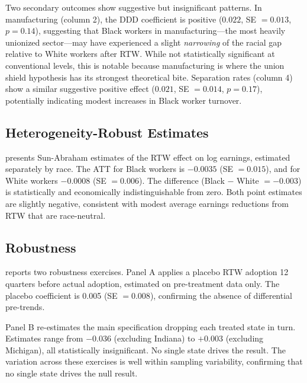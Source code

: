 \documentclass[12pt]{article}
\begin{document}
Two secondary outcomes show suggestive but insignificant patterns. In manufacturing (column 2), the DDD coefficient is positive ($0.022$, SE $= 0.013$, $p = 0.14$), suggesting that Black workers in manufacturing---the most heavily unionized sector---may have experienced a slight \textit{narrowing} of the racial gap relative to White workers after RTW. While not statistically significant at conventional levels, this is notable because manufacturing is where the union shield hypothesis has its strongest theoretical bite. Separation rates (column 4) show a similar suggestive positive effect ($0.021$, SE $= 0.014$, $p = 0.17$), potentially indicating modest increases in Black worker turnover.



\subsection{Heterogeneity-Robust Estimates}

 presents Sun-Abraham estimates of the RTW effect on log earnings, estimated separately by race. The ATT for Black workers is $-0.0035$ (SE $= 0.015$), and for White workers $-0.0008$ (SE $= 0.006$). The difference (Black $-$ White $= -0.003$) is statistically and economically indistinguishable from zero. Both point estimates are slightly negative, consistent with modest average earnings reductions from RTW that are race-neutral.



\subsection{Robustness}

 reports two robustness exercises. Panel A applies a placebo RTW adoption 12 quarters before actual adoption, estimated on pre-treatment data only. The placebo coefficient is 0.005 (SE $= 0.008$), confirming the absence of differential pre-trends.

Panel B re-estimates the main specification dropping each treated state in turn. Estimates range from $-0.036$ (excluding Indiana) to $+0.003$ (excluding Michigan), all statistically insignificant. No single state drives the result. The variation across these exercises is well within sampling variability, confirming that no single state drives the null result.


\end{document}

